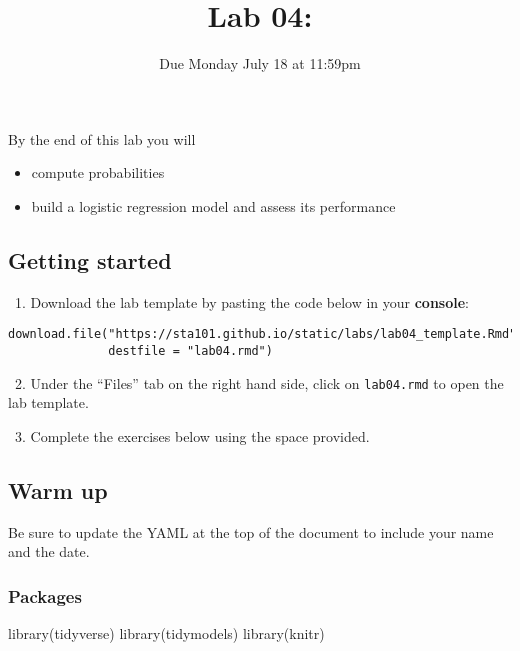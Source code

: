 \documentclass[
]{article}
\title{Lab 04:}
\author{}
\date{\vspace{-2.5em}Due Monday July 18 at 11:59pm}
\newenvironment{Shaded}{\begin{snugshade}}{\end{snugshade}}
\newcommand{\FunctionTok}[1]{\textcolor[rgb]{0.00,0.00,0.00}{#1}}
\newcommand{\NormalTok}[1]{#1}
\providecommand{\tightlist}{%
  \setlength{\itemsep}{0pt}\setlength{\parskip}{0pt}}
\begin{document}
\maketitle

By the end of this lab you will

\begin{itemize}
\tightlist
\item
  compute probabilities
\item
  build a logistic regression model and assess its performance
\end{itemize}

\hypertarget{getting-started}{%
\subsection{Getting started}\label{getting-started}}

~1. Download the lab template by pasting the code below in your
\textbf{console}:

\begin{verbatim}
download.file("https://sta101.github.io/static/labs/lab04_template.Rmd",
              destfile = "lab04.rmd")
\end{verbatim}

~2. Under the ``Files'' tab on the right hand side, click on
\texttt{lab04.rmd} to open the lab template.

~3. Complete the exercises below using the space provided.

\hypertarget{warm-up}{%
\subsection{Warm up}\label{warm-up}}

Be sure to update the YAML at the top of the document to include your
name and the date.

\hypertarget{packages}{%
\subsubsection{Packages}\label{packages}}

\begin{Shaded}
\begin{Highlighting}[]
\FunctionTok{library}\NormalTok{(tidyverse)}
\FunctionTok{library}\NormalTok{(tidymodels)}
\FunctionTok{library}\NormalTok{(knitr)}
\end{Highlighting}
\end{Shaded}
\end{document}
